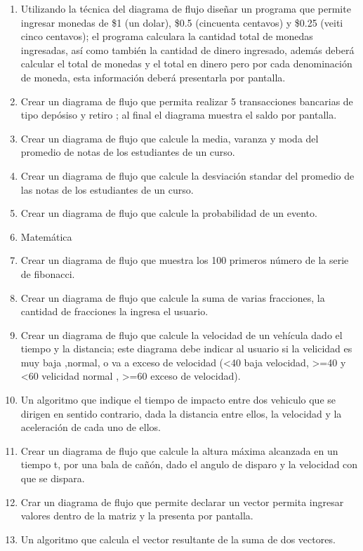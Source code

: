 \documentclass[a4paper,12pt,spanish]{article}
\begin{document}
\begin{enumerate}
\item   Utilizando la técnica del diagrama de flujo diseñar un programa que permite ingresar monedas de \$1 (un dolar), \$0.5 (cincuenta centavos) y \$0.25 (veiti cinco centavos); el programa calculara la cantidad total de monedas ingresadas, así como también la cantidad de dinero ingresado, además deberá calcular el  total de monedas y el total en dinero pero por cada denominación de moneda, esta información deberá presentarla por pantalla.
  
\item Crear un diagrama de flujo que permita realizar 5 transacciones bancarias de tipo depósiso y retiro ; al final el diagrama muestra el saldo por pantalla. 
\item Crear un diagrama de flujo que calcule la media, varanza y moda del promedio de notas de los estudiantes de un curso. 
\item Crear un diagrama de flujo que calcule la desviación standar del promedio de las notas de los estudiantes de un curso.
\item Crear un diagrama de flujo que calcule la probabilidad de un evento.
\item Matemática
\item Crear un diagrama de flujo que muestra los 100 primeros número de la serie de fibonacci.
\item Crear un diagrama de flujo que calcule la suma de varias fracciones, la cantidad de fracciones la ingresa el usuario.
\item Crear un diagrama de flujo que calcule la velocidad de un vehícula dado el tiempo y la distancia; este diagrama debe indicar al usuario si la velicidad es muy baja ,normal, o va a exceso de velocidad (<40 baja velocidad, >=40 y <60 velicidad normal , >=60 exceso de velocidad).
\item Un algoritmo que indique el tiempo de impacto entre dos vehiculo que se dirigen en sentido contrario, dada la distancia entre ellos, la velocidad y la aceleración de cada uno de ellos.
\item Crear un diagrama de flujo que calcule la altura máxima alcanzada en un tiempo t, por una bala de cañón, dado el angulo de disparo y la velocidad con que se dispara.
\item Crar un diagrama de flujo que permite declarar un vector permita ingresar valores dentro de la matriz y la presenta por pantalla.
\item  Un algoritmo que calcula el vector resultante de la suma de dos vectores.

\end{enumerate}
\end{document}
